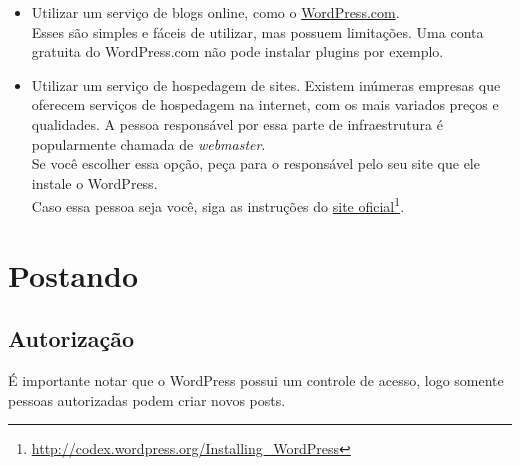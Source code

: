 \documentclass[12pt,onecolumn]{article}
\begin{document}
	\begin{itemize}
	\item Utilizar um serviço de blogs online, como o \href{https://wordpress.com/}{WordPress.com}. \\
		Esses são simples e fáceis de utilizar, mas possuem limitações. Uma conta gratuita do WordPress.com 
		não pode instalar plugins por exemplo.

	\item Utilizar um serviço de hospedagem de sites. Existem inúmeras empresas que oferecem serviços de hospedagem
		na internet, com os mais variados preços e qualidades.
		A pessoa responsável por essa parte de infraestrutura é popularmente chamada de \textit{webmaster}.
		\vspace{5 mm} \\
		Se você escolher essa opção, peça para o responsável pelo seu site que ele instale o WordPress. \\
		Caso essa pessoa seja você, siga as instruções do 
		\href{http://codex.wordpress.org/Installing_WordPress}{site oficial}\footnote{\url{http://codex.wordpress.org/Installing_WordPress}}.
	\end{itemize}

\clearpage
\section{Postando}
	\subsection{Autorização}
		É importante notar que o WordPress possui um controle de acesso, logo 
		somente pessoas autorizadas podem criar novos posts.
		
\end{document}
